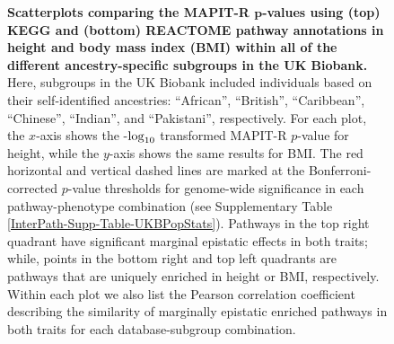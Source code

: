 \documentclass[10pt]{article}
\def\log{{\rm log}}
\begin{document}
\begin{landscape}
\begin{figure}[htbp]
\caption{\textbf{Scatterplots comparing the MAPIT-R $\bm{p}$-values using (top) KEGG and (bottom) REACTOME pathway annotations in height and body mass index (BMI) within all of the different ancestry-specific subgroups in the UK Biobank.} Here, subgroups in the UK Biobank included individuals based on their self-identified ancestries: ``African'', ``British'', ``Caribbean'', ``Chinese'', ``Indian'', and ``Pakistani'', respectively. For each plot, the $x$-axis shows the -$\log_{10}$ transformed MAPIT-R $p$-value for height, while the $y$-axis shows the same results for BMI. The red horizontal and vertical dashed lines are marked at the Bonferroni-corrected $p$-value thresholds for genome-wide significance in each pathway-phenotype combination (see Supplementary Table \ref{InterPath-Supp-Table-UKBPopStats}). Pathways in the top right quadrant have significant marginal epistatic effects in both traits; while, points in the bottom right and top left quadrants are pathways that are uniquely enriched in height or BMI, respectively. Within each plot we also list the Pearson correlation coefficient describing the similarity of marginally epistatic enriched pathways in both traits for each database-subgroup combination.}
\label{InterPath-Supp-Figure-MAPITR-PhenoComps-AllPops}
\end{figure}
\clearpage
\setlength{\footskip}{1cm}
\end{landscape}

\end{document}
